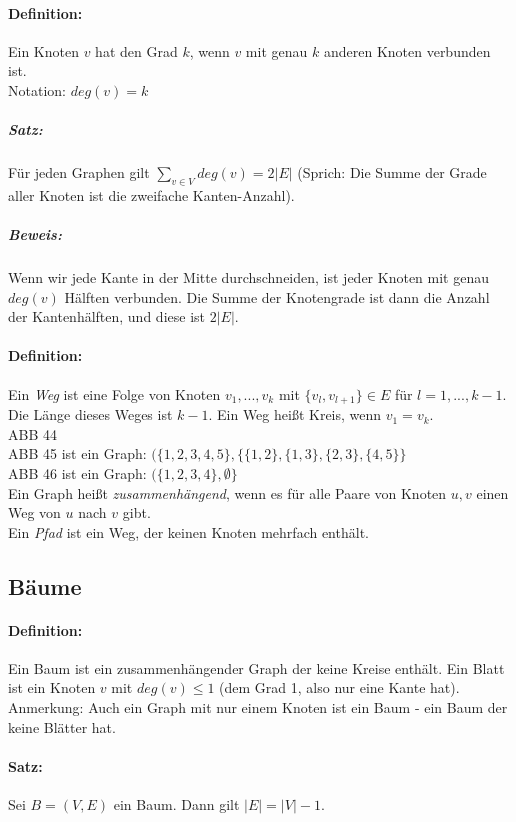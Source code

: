 \paragraph{Definition:} Ein Knoten $v$ hat den Grad $k$, wenn $v$ mit genau $k$ anderen Knoten verbunden ist. \\
Notation: $deg(v)=k$

\subparagraph{Satz:} Für jeden Graphen gilt $\sum_{v\in V}deg(v)=2|E|$ (Sprich: Die Summe der Grade aller Knoten ist die zweifache Kanten-Anzahl).

\subparagraph{Beweis:} Wenn wir jede Kante in der Mitte durchschneiden, ist jeder Knoten mit genau $deg(v)$ Hälften verbunden. Die Summe der Knotengrade ist dann die Anzahl der Kantenhälften, und diese ist $2|E|$.

\paragraph{Definition:} Ein \emph{Weg} ist eine Folge von Knoten $v_1, ... , v_k$ mit $\{v_l,v_{l+1}\}\in E$ für $l=1, ..., k-1$. Die Länge dieses Weges ist $k-1$. Ein Weg heißt Kreis, wenn $v_1=v_k$.\\
ABB 44\\
ABB 45 ist ein Graph: $(\{1,2,3,4,5\},\{\{1,2\},\{1,3\},\{2,3\},\{4,5\}\}$\\
ABB 46 ist ein Graph: $(\{1,2,3,4\},\emptyset\}$\\
Ein Graph heißt \emph{zusammenhängend}, wenn es für alle Paare von Knoten $u,v$ einen Weg von $u$ nach $v$ gibt.\\
Ein \emph{Pfad} ist ein Weg, der keinen Knoten mehrfach enthält.

\subsection{Bäume}
\paragraph{Definition:} Ein Baum ist ein zusammenhängender Graph der keine Kreise enthält. Ein Blatt ist ein Knoten $v$ mit $deg(v)\leq 1$ (dem Grad 1, also nur eine Kante hat).\\
Anmerkung: Auch ein Graph mit nur einem Knoten ist ein Baum - ein Baum der keine Blätter hat.

\paragraph{Satz:} Sei $B=(V,E)$ ein Baum. Dann gilt $|E|=|V|-1$.

